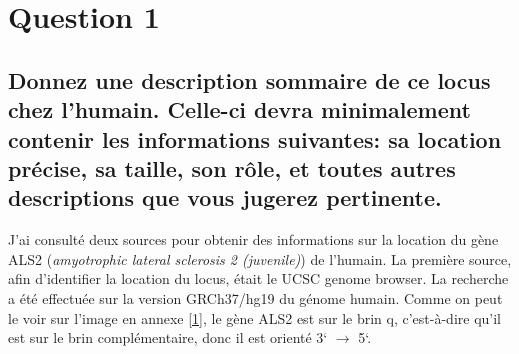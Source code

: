\documentclass[11pt]{article} %
\begin{document}

\tableofcontents %

\newpage %

\section{Question 1} %

\subsection[Description du gène ALS2]{Donnez une description sommaire de ce locus chez l'humain. Celle-ci devra 
minimalement contenir les informations suivantes: sa location précise, sa taille, son rôle,
et toutes autres descriptions que vous jugerez pertinente.}

J'ai consulté deux sources pour obtenir des informations sur la location du gène ALS2 (\emph{amyotrophic lateral sclerosis 2 (juvenile)}) de l'humain. La première source,
afin d'identifier la location du locus, était le UCSC genome browser. La recherche a été effectuée sur la version GRCh37/hg19
du génome humain. Comme on peut le voir sur l'image en annexe \ref{1}, le gène ALS2 est sur le brin q, c'est-à-dire qu'il est sur le brin complémentaire, donc il est orienté 3` $\rightarrow$ 5`.
\end{document}
